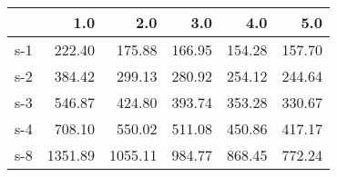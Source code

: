\begin{tabular}{lrrrrr}
\toprule
{} &     1.0 &     2.0 &    3.0 &    4.0 &    5.0 \\
\midrule
s-1 &  222.40 &  175.88 & 166.95 & 154.28 & 157.70 \\
s-2 &  384.42 &  299.13 & 280.92 & 254.12 & 244.64 \\
s-3 &  546.87 &  424.80 & 393.74 & 353.28 & 330.67 \\
s-4 &  708.10 &  550.02 & 511.08 & 450.86 & 417.17 \\
s-8 & 1351.89 & 1055.11 & 984.77 & 868.45 & 772.24 \\
\bottomrule
\end{tabular}
